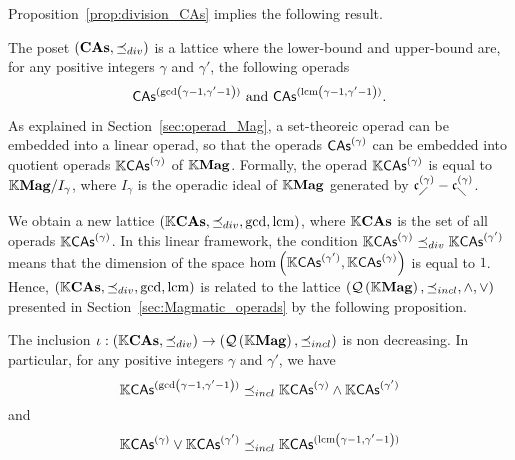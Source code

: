 Proposition~\ref{prop:division_CAs} implies the following result.
\medbreak

\begin{Theorem}\label{thm:lattice_CAs}
    The poset $\left(\mathbf{CAs}, \preceq_{div}\right)$ is a lattice where
    the lower-bound and upper-bound are, for any positive integers
    $\gamma$ and $\gamma'$, the following operads
    \begin{equation}
      \mathsf{CAs}^{(\gcd \left(\gamma-1, \gamma'-1\right))}\ \text{and}\
      \mathsf{CAs}^{(\operatorname{lcm} \left(\gamma-1, \gamma'-1\right))}.
    \end{equation}
\end{Theorem}
\medbreak

As explained in Section~\ref{sec:operad_Mag}, a set-theoreic operad can
be embedded into a linear operad, so that the operads $\mathsf{CAs}^{(\gamma)}$ can
be embedded into quotient operads $\mathbb{K}\mathsf{CAs}^{(\gamma)}$ of $\mathbb{K}\mathbf{Mag}$. Formally,
the operad $\mathbb{K}\mathsf{CAs}^{(\gamma)}$ is equal to $\mathbb{K}\mathbf{Mag}/I_{\gamma}$, where
$I_{\gamma}$ is the operadic ideal of $\mathbb{K}\mathbf{Mag}$ generated by
$\mathfrak{c}^{(\gamma)}_{\diagup}-\mathfrak{c}^{(\gamma)}_{\diagdown}$.

We obtain a
new lattice $\left(\mathbb{K}\mathbf{CAs},\preceq_{div},\gcd,\operatorname{lcm}\right)$, where $\mathbb{K}\mathbf{CAs}$
is the set of all operads $\mathbb{K}\mathsf{CAs}^{(\gamma)}$. In this linear framework, the
condition $\mathbb{K}\mathsf{CAs}^{(\gamma)}\preceq_{div}\mathbb{K}\mathsf{CAs}^{(\gamma')}$ means that the dimension
of the space $\text{hom}\left(\mathbb{K}\mathsf{CAs}^{(\gamma')},\mathbb{K}\mathsf{CAs}^{(\gamma)}\right)$ is
equal to $1$. Hence, $\left(\mathbb{K}\mathbf{CAs},\preceq_{div},\gcd,\operatorname{lcm}\right)$ is related
to the lattice $\left(\mathcal{Q}\left(\mathbb{K}\mathbf{Mag}\right),\preceq_{incl},\wedge,\vee\right)$ presented in
Section~\ref{sec:Magmatic_operads} by the following proposition.

\begin{Proposition}
  The inclusion
  $\iota:\left(\mathbb{K}\mathbf{CAs},\preceq_{div}\right)\to\left(\mathcal{Q}\left(\mathbb{K}\mathbf{Mag}\right),\preceq_{incl}\right)$ is
  non decreasing. In particular, for any positive integers $\gamma$ and
  $\gamma'$, we have
  \begin{equation} \label{equ:comparison_of_lattice_operations}
    \mathbb{K}\mathsf{CAs}^{(\gcd \left(\gamma-1, \gamma'-1\right))}\preceq_{incl}
    \mathbb{K}\mathsf{CAs}^{(\gamma)}\wedge\mathbb{K}\mathsf{CAs}^{(\gamma')}
  \end{equation}
  and
  \begin{equation}
    \mathbb{K}\mathsf{CAs}^{(\gamma)}\vee\mathbb{K}\mathsf{CAs}^{(\gamma')}\preceq_{incl}
    \mathbb{K}\mathsf{CAs}^{(\operatorname{lcm} \left(\gamma-1, \gamma'-1\right))}
  \end{equation}

  \end{Proposition}



